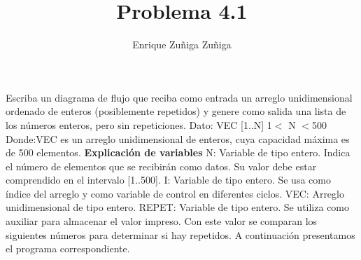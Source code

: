 \documentclass[11pt]{amsart}
\title{Problema 4.1}
\author{Enrique Zuñiga Zuñiga}
\begin{document}
\maketitle
\noindent Escriba un diagrama de flujo que reciba como entrada un arreglo unidimensional ordenado de enteros (posiblemente repetidos) y genere como salida una lista de los números enteros, pero sin repeticiones.  
Dato: VEC [1..N] 1$ <$ N $< $500  \newline
Donde:VEC es un arreglo unidimensional de enteros, cuya capacidad máxima es de 500 elementos.  \newline 
\textbf{Explicación de variables} \newline
N: Variable de tipo entero. Indica el número de elementos que se recibirán como datos. Su valor debe estar comprendido en el intervalo [1..500]. \newline
I: Variable de tipo entero. Se usa como índice del arreglo y como variable de control en diferentes ciclos.
VEC: Arreglo unidimensional de tipo entero. \newline
REPET: Variable de tipo entero. Se utiliza como auxiliar para almacenar el valor impreso. Con este valor se comparan los siguientes números \newline
para determinar si hay repetidos. \newline
A continuación presentamos el programa correspondiente. \newline

\end{document}
